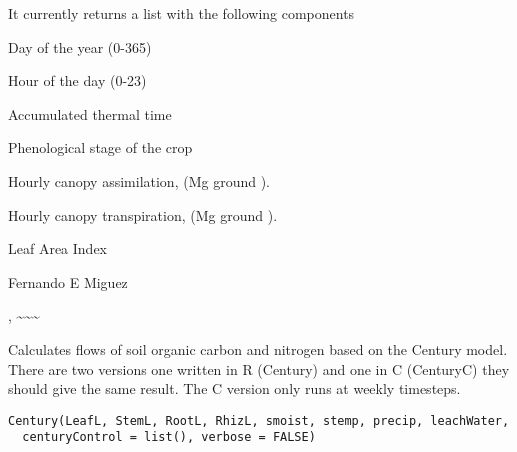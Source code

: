 \documentclass[letterpaper]{book}
\begin{document}
%
\begin{Value}
It currently returns a list with the following components

\begin{ldescription}
\item[\code{DayofYear}] Day of the year (0-365)

\item[\code{Hour}] Hour of the day (0-23)

\item[\code{TTTc}] Accumulated thermal time

\item[\code{PhenoStage}] Phenological stage of the crop

\item[\code{CanopyAssim}] Hourly canopy assimilation, (Mg
 ground ).

\item[\code{CanopyTrans}] Hourly canopy transpiration, (Mg
 ground ).

\item[\code{LAI}] Leaf Area Index
\end{ldescription}
\end{Value}
%
\begin{Author}\relax
Fernando E Miguez
\end{Author}
%
\begin{SeeAlso}\relax
{} 
, \textasciitilde{}\textasciitilde{}\textasciitilde{}
\end{SeeAlso}
%
\begin{Description}\relax
Calculates flows of soil organic carbon and nitrogen based
on the Century model. There are two versions one written in
R (Century) and one in C (CenturyC) they should give the
same result. The C version only runs at weekly timesteps.
\end{Description}
%
\begin{Usage}
\begin{verbatim}
Century(LeafL, StemL, RootL, RhizL, smoist, stemp, precip, leachWater,
  centuryControl = list(), verbose = FALSE)
\end{verbatim}
\end{Usage}
%
\end{document}
